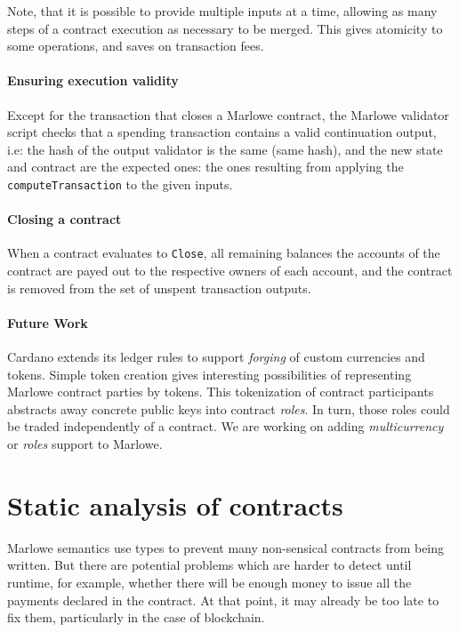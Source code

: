 \documentclass[runningheads]{llncs}
\begin{document}
Note, that it is possible to provide multiple inputs at a time,
allowing as many steps of a contract execution as necessary to be merged.
This gives atomicity to some operations, and saves on transaction fees.

\paragraph{Ensuring execution validity}

Except for the transaction that closes a Marlowe contract, the Marlowe validator script checks that a spending transaction contains a valid continuation
output, i.e: the hash of the output validator is the same (same hash), and the new state and contract are the expected ones: the ones resulting from applying the \texttt{computeTransaction} to the given inputs.

\paragraph{Closing a contract}

When a contract evaluates to \texttt{Close}, all remaining balances the accounts of the contract are payed out
to the respective owners of each account, and the contract is removed from the set of unspent transaction outputs.

\paragraph{Future Work}

Cardano extends its ledger rules to support \emph{forging} of custom currencies and tokens.%
Simple token creation gives interesting possibilities of representing Marlowe contract parties by tokens.
This tokenization of contract participants abstracts away concrete public keys into contract \emph{roles}.
In turn, those roles could be traded independently of a contract. 
We are working on adding \emph{multicurrency} or \emph{roles} support to Marlowe.

\section{Static analysis of contracts\label{sec:static}}

Marlowe semantics use types to prevent many non-sensical contracts from being written. But there are potential problems which are harder to detect until runtime, for example, whether there will be enough money to issue all the payments declared in the contract. At that point, it may already be too late to fix them, particularly in the case of blockchain.
\end{document}
